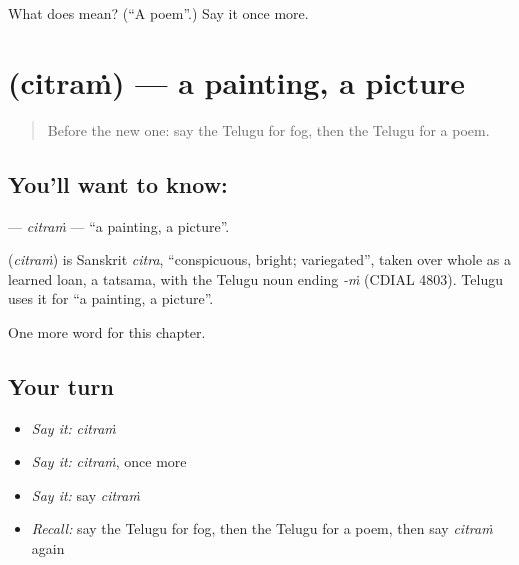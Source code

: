 \begin{tcolorbox}[breakable,colback=teal!4,colframe=teal!35!black,title={Before you move on}]
What does  mean? (\textquotedblleft{}A poem\textquotedblright{}.) Say it once more.
\end{tcolorbox}
\section[\texorpdfstring{\te{చిత్రం} (citraṁ)}{చిత్రం (citraṁ)}]{ (citraṁ) — a painting, a picture}

\label{lesson:TE-C230-citram}



\begin{quote}
Before the new one: say the Telugu for fog, then the Telugu for a poem.
\end{quote}

\subsection*{You'll want to know: }
\textbf{} — \emph{citraṁ} — \textquotedblleft{}a painting, a picture\textquotedblright{}.

\begin{cousinweb}
\textbf{} (\emph{citraṁ}) is Sanskrit \emph{citra}, \textquotedblleft{}conspicuous, bright; variegated\textquotedblright{}, taken over whole as a learned loan, a tatsama, with the Telugu noun ending \emph{-ṁ} (CDIAL 4803). Telugu uses it for \textquotedblleft{}a painting, a picture\textquotedblright{}.
\end{cousinweb}

\begin{grammarlens}[title={What you've built}]
One more word for this chapter.
\end{grammarlens}

\subsection*{Your turn}
\begin{itemize}
\raggedright
  \item \emph{Say it:} \emph{citraṁ}
  \item \emph{Say it:} \emph{citraṁ}, once more
  \item \emph{Say it:} say \emph{citraṁ}
  \item \emph{Recall:} say the Telugu for fog, then the Telugu for a poem, then say \emph{citraṁ} again
\end{itemize}


